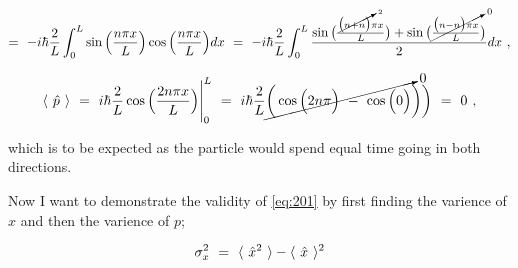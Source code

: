 \documentclass{article}
\begin{document}
\begin{equation} \label{eq:250}
= \hspace{0.125cm} -i\hbar \frac{2}{L} \int_{0}^{L} \sin\Big(\frac{n\pi x}{L}\Big)\cos\Big(\frac{n\pi x}{L}\Big) dx  \hspace{0.125cm} = \hspace{0.125cm} -i\hbar \frac{2}{L} \int_{0}^{L} \frac{\sin\big(\frac{\cancelto{2}{\big(n + n\big)}\pi x}{L} \big) + \sin\big(\cancelto{0}{\frac{\big(n - n\big)\pi x}{L}} \big)}{2} dx \hspace{0.125cm} , 
\end{equation}

\begin{equation} \label{eq:251}
\langle \hspace{0.125cm} \hat{p} \hspace{0.125cm} \rangle \hspace{0.125cm} = \hspace{0.125cm} i\hbar \frac{2}{L} \cos\Big(\frac{2n\pi x}{L}\Big) \Bigg|_{0}^{L} \hspace{0.125cm} = \hspace{0.125cm} i\hbar  \frac{2}{L} \cancelto{0}{\bigg( \cos\Big( 2n\pi \Big) \hspace{0.125cm} - \hspace{0.125cm} \cos\Big( 0 \Big)} \bigg) \bigg) \hspace{0.125cm} = \hspace{0.125cm} 0 \hspace{0.125cm} , 
\end{equation}

which is to be expected as the particle would spend equal time going in both directions. 

Now I want to demonstrate the validity of \ref{eq:201} by first finding the varience of \begin{math} x \end{math} and then the varience of \begin{math} p \end{math};

\begin{equation} \label{eq:252}
\sigma_{x}^{2} \hspace{0.125cm} = \hspace{0.125cm} \langle \hspace{0.125cm} \hat{x}^{2} \hspace{0.125cm} \rangle - \langle \hspace{0.125cm} \hat{x} \hspace{0.125cm} \rangle^{2} 
\end{equation}
\end{document}
